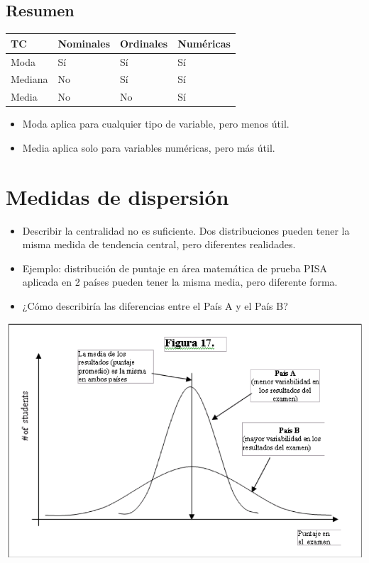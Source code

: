\documentclass[
]{article}
\begin{document}
\hypertarget{resumen}{%
\subsection{Resumen}\label{resumen}}

\begin{longtable}[]{@{}
  >{\raggedright\arraybackslash}p{}
  >{\centering\arraybackslash}p{}
  >{\centering\arraybackslash}p{}
  >{\centering\arraybackslash}p{}@{}}
\toprule
TC & Nominales & Ordinales & Numéricas \\
\midrule
\endhead
Moda & Sí & Sí & Sí \\
Mediana & No & Sí & Sí \\
Media & No & No & Sí \\
\bottomrule
\end{longtable}

\begin{itemize}
\item
  Moda aplica para cualquier tipo de variable, pero menos útil.
\item
  Media aplica solo para variables numéricas, pero más útil.
\end{itemize}

\hypertarget{medidas-de-dispersiuxf3n}{%
\section{Medidas de dispersión}\label{medidas-de-dispersiuxf3n}}

\begin{itemize}
\item
  Describir la centralidad no es suficiente. Dos distribuciones pueden
  tener la misma medida de tendencia central, pero diferentes
  realidades.
\item
  Ejemplo: distribución de puntaje en área matemática de prueba PISA
  aplicada en 2 países pueden tener la misma media, pero diferente
  forma.
\item
  ¿Cómo describiría las diferencias entre el País A y el País B?
\end{itemize}

\includegraphics[width=6.57292in,height=\textheight]{distr.png}
\end{document}
